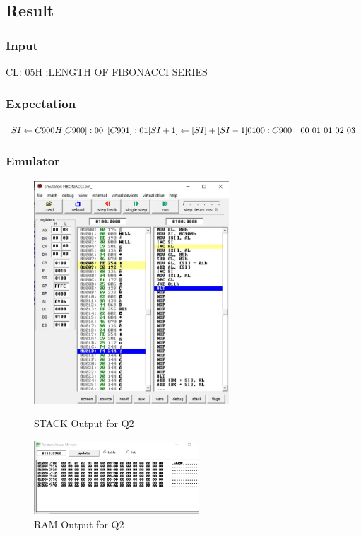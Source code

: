 \documentclass{article}
\begin{document}
\subsection{Result}
\subsubsection{Input}
CL: 05H ;LENGTH OF FIBONACCI SERIES

\subsubsection{Expectation}

$ SI \leftarrow C900H \\
\lbrack C900 \rbrack :  00 \, \  
\lbrack C901\rbrack: 01 \\
\lbrack SI + 1 \rbrack \leftarrow 
\lbrack SI  \rbrack + \lbrack SI - 1 \rbrack \\  
0100:C900\ \ \  00\ 01\ 01\ 02\ 03
$ 


\subsubsection{Emulator}
\begin{figure}[h]
\begin{center}
\includegraphics[width=0.65\textwidth]{FIB_OUT1} 
\caption{STACK Output for Q2}
\end{center}
\begin{center}
\includegraphics[width=0.55\textwidth]{FIB_OUT2} 
\caption{RAM Output for Q2}
\end{center}
\end{figure}
\end{document}
